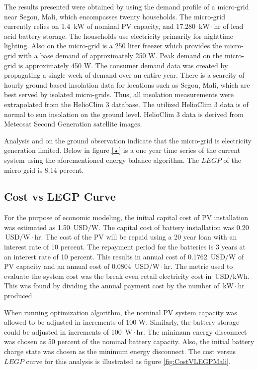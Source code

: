 \documentclass{article}
\newcommand{\unit}[1]{\ensuremath{\, \mathrm{#1}}}
\begin{document}
The results presented were obtained by using the demand profile of a micro-grid near Segou, Mali, which encompasses twenty households.
The micro-grid currently relies on 1.4 \unit{kW} of nominal PV capacity, and 17.280 \unit{kW\cdot hr} of lead acid battery storage.
The households use electricity primarily for nighttime lighting.
Also on the micro-grid is a 250 liter freezer which provides the micro-grid with a base demand of approximately 250 W. 
Peak demand on the micro-grid is approximately 450 W. 
The consumer demand data was created by propagating a single week of demand over an entire year.
There is a scarcity of hourly ground based insolation data for locations such as Segou, Mali, which are best served by isolated micro-grids. 
Thus, all insolation measurements were extrapolated from the HelioClim 3 database. The utilized HelioClim 3 data is of normal to sun insolation on the ground level.
HelioClim 3 data is derived from Meteosat Second Generation satellite images. 

Analysis and on the ground observation indicate that the micro-grid is electricity generation limited. 
Below in figure \ref{•} is a one year time series of the current system using the aforementioned energy balance algorithm.
The $LEGP$ of the micro-grid is 8.14 percent.

\subsection{Cost vs LEGP Curve}

For the purpose of economic modeling, the initial capital cost of PV installation was estimated as 1.50 \unit{USD/W}.
The capital cost of battery installation was 0.20 \unit{USD/W\cdot hr}. 
The cost of the PV will be repaid using a 20 year loan with an interest rate of 10 percent. 
The repayment period for the batteries is 3 years at an interest rate of 10 percent. 
This results in annual cost of 0.1762 \unit{USD/W} of PV capacity and an annual cost of 0.0804 \unit{USD/W\cdot hr}.
The metric used to evaluate the system cost was the break even retail electricity cost in \unit{USD/kWh}. This was found by dividing the annual payment cost by the number of \unit{kW\cdot hr} produced.

When running optimization algorithm, the nominal PV system capacity was allowed to be adjusted in increments of 100 W. 
Similarly, the battery storage could be adjusted in increments of 100 \unit{W\cdot hr}.
The minimum energy disconnect was chosen as 50 percent of the nominal battery capacity.
Also, the initial battery charge state was chosen as the minimum energy disconnect.
The cost versus $LEGP$ curve for this analysis is illustrated as figure \ref{fig:CostVLEGPMali}.
\end{document}
